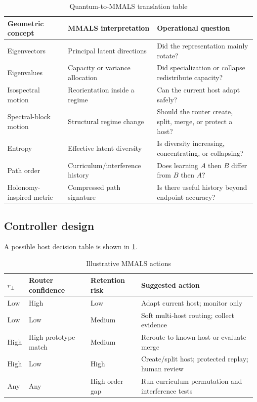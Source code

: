 \begin{table}[H]
\centering
\caption{Quantum-to-MMALS translation table}
\begin{tabularx}{\textwidth}{p{} X X}
\toprule
\textbf{Geometric concept} & \textbf{MMALS interpretation} & \textbf{Operational question} \\
\midrule
Eigenvectors & Principal latent directions & Did the representation mainly rotate? \\
Eigenvalues & Capacity or variance allocation & Did specialization or collapse redistribute capacity? \\
Isospectral motion & Reorientation inside a regime & Can the current host adapt safely? \\
Spectral-block motion & Structural regime change & Should the router create, split, merge, or protect a host? \\
Entropy & Effective latent diversity & Is diversity increasing, concentrating, or collapsing? \\
Path order & Curriculum/interference history & Does learning $A$ then $B$ differ from $B$ then $A$? \\
Holonomy-inspired metric & Compressed path signature & Is there useful history beyond endpoint accuracy? \\
\bottomrule
\end{tabularx}
\end{table}

\subsection{Controller design}

A possible host decision table is shown in \cref{tab:mmals_decisions}.

\begin{table}[H]
\centering
\caption{Illustrative MMALS actions}
\label{tab:mmals_decisions}
\begin{tabularx}{\textwidth}{p{} p{} p{} X}
\toprule
$r_\perp$ & Router confidence & Retention risk & Suggested action \\
\midrule
Low & High & Low & Adapt current host; monitor only \\
Low & Low & Medium & Soft multi-host routing; collect evidence \\
High & High prototype match & Medium & Reroute to known host or evaluate merge \\
High & Low & High & Create/split host; protected replay; human review \\
Any & Any & High order gap & Run curriculum permutation and interference tests \\
\bottomrule
\end{tabularx}
\end{table}

